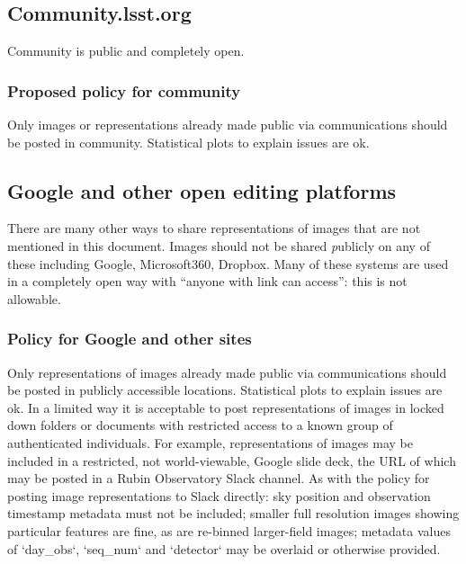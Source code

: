 \subsection{Community.lsst.org}
Community is public and completely open.
\subsubsection{Proposed policy for community}
Only images or representations already made public via communications should be posted in community.
Statistical plots to explain issues are ok.

\subsection{Google and other open editing platforms}
There are many other ways to share representations of images that are not mentioned in this document.
Images should not be shared {\emph publicly} on any of these including Google, Microsoft360, Dropbox.
Many of these systems are used in a completely open way with ``anyone with link can access'': this is not allowable.

\subsubsection{Policy for Google and other sites}
Only representations of images already made public via communications should be posted in publicly accessible locations.
Statistical plots to explain issues are ok.
In a limited way it is acceptable to post representations of images in locked down folders or documents with restricted access to a known group of authenticated individuals.
For example, representations of images may be included in a restricted, not world-viewable, Google slide deck, the URL of which may be posted in a Rubin Observatory Slack channel.
As with the policy for posting image representations to Slack directly: 
sky position and observation timestamp metadata must not be included; 
smaller full resolution images showing particular features are fine, as are re-binned larger-field images; 
metadata values of `day_obs`, `seq_num` and `detector` may be overlaid or otherwise provided.

